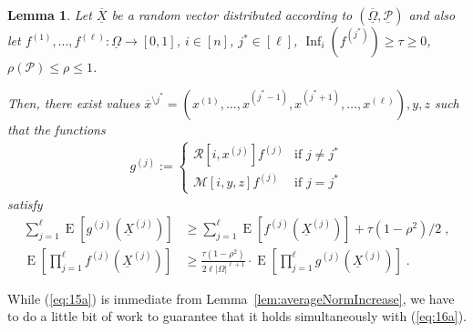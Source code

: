 \documentclass{daj}
\newcommand{\1}{\mathbbm{1}}
\theoremstyle{plain}
\newtheorem{lemma}[theorem]{Lemma}
\theoremstyle{definition}
\DeclareMathOperator*{\EE}{E}
\DeclareMathOperator{\Inf}{Inf}
\newcommand{\cM}{\mathcal{M}}
\newcommand{\cR}{\mathcal{R}}
\begin{document}
\begin{lemma}
\label{lem:second-reduction-single-step}
Let $\overline{\underline{X}}$ be a random vector distributed according to
$(\overline{\underline{\Omega}}, \underline{\mathcal{P}})$ and also let
$f^{(1)},\ldots,f^{(\ell)}: \underline{\Omega} \to [0,1]$,
$i \in [n]$, $j^* \in [\ell]$, $\Inf_{i}(f^{(j^*)}) \geq \tau \ge 0$,
$\rho(\mathcal{P}) \le \rho \le 1$.

Then, there exist values 
$\overline{x}^{\setminus j^*} = (x^{(1)}, \ldots, x^{(j^*-1)}, x^{(j^*+1)}, \ldots,
x^{(\ell)}), y, z$
such that the functions
\begin{align}\label{eq:17a}
g^{(j)} := \begin{cases}
\cR[i,x^{(j)}]f^{(j)} & \text{if $j \neq j^*$}\\
\cM[i,y,z]f^{(j)} & \text{if $j = j^*$}
\end{cases}
\end{align}
satisfy
\begin{align}
\sum_{j=1}^{\ell} \EE[ g^{(j)}(\underline{X}^{(j)})]
&\geq 
\sum_{j=1}^{\ell} \EE[f^{(j)}(\underline{X}^{(j)})] +
\tau(1-\rho^2)/2
\; , \label{eq:15a}\\
\EE\left[\prod_{j=1}^{\ell} f^{(j)}(\underline{X}^{(j)})\right]
&\geq
\frac{\tau(1-\rho^2)}{2\ell|\Omega|^{\ell+1}} 
\cdot \EE\left[\prod_{j=1}^{\ell} g^{(j)}(\underline{X}^{(j)})\right]\label{eq:16a}
\; .
\end{align}
\end{lemma}
While (\ref{eq:15a}) is immediate from
Lemma~\ref{lem:averageNormIncrease}, we have to do a little bit of work 
to guarantee that it holds simultaneously with (\ref{eq:16a}).
\end{document}
